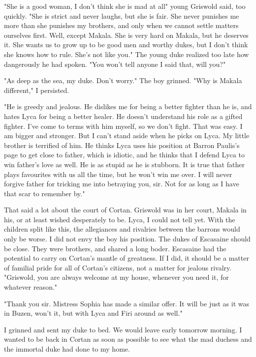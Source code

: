 \documentclass{article}
\begin{document}
"She is a good woman, I don't think she is mad at all" young Griswold said, too quickly. "She is strict and never laughs, but she is fair. She never punishes me more than she punishes my brothers, and only when we cannot settle matters ourselves first. Well, except Makala. She is very hard on Makala, but he deserves it. She wants us to grow up to be good men and worthy dukes, but I don't think she knows how to rule. She's not like you." The young duke realized too late how dangerously he had spoken. "You won't tell anyone I said that, will you?"

"As deep as the sea, my duke. Don't worry." The boy grinned. "Why is Makala different," I persisted.

"He is greedy and jealous. He dislikes me for being a better fighter than he is, and hates Lyca for being a better healer. He doesn't understand his role as a gifted fighter. I've come to terms with him myself, so we don't fight. That was easy. I am bigger and stronger. But I can't stand aside when he picks on Lyca. My little brother is terrified of him. He thinks Lyca uses his position at Barron Paulis's page to get close to father, which is idiotic, and he thinks that I defend Lyca to win father's love as well. He is as stupid as he is stubborn. It is true that father plays favourites with us all the time, but he won't win me over. I will never forgive father for tricking me into betraying you, sir. Not for as long as I have that scar to remember by."

That said a lot about the court of Cortan. Griswold was in her court, Makala in his, or at least wished desperately to be. Lyca, I could not tell yet. With the children split like this, the allegiances and rivalries between the barrons would only be worse. I did not envy the boy his position. The dukes of Escasaine should be close. They were brothers, and shared a long boder. Escasaine had the potential to carry on Cortan's mantle of greatness. If I did, it should be a matter of familial pride for all of Cortan's citizens, not a matter for jealous rivalry. "Griswold, you are always welcome at my house, whenever you need it, for whatever reason."

"Thank you sir. Mistress Sophia has made a similar offer. It will be just as it was in Buzen, won't it, but with Lyca and Firi around as well."

I grinned and sent my duke to bed. We would leave early tomorrow morning. I wanted to be back in Cortan as soon as possible to see what the mad duchess and the immortal duke had done to my home.
\end{document}
